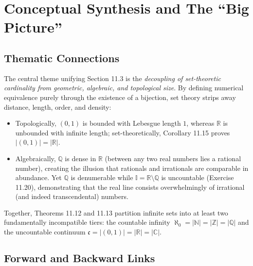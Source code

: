 \documentclass[11pt, letterpaper]{article}
\theoremstyle{definition}
\theoremstyle{remark}
\begin{document}
\section{Conceptual Synthesis and The ``Big Picture''}

\subsection{Thematic Connections}

The central theme unifying Section 11.3 is the \emph{decoupling of set-theoretic cardinality from geometric, algebraic, and topological size}. By defining numerical equivalence purely through the existence of a bijection, set theory strips away distance, length, order, and density:
\begin{itemize}
    \item Topologically, $(0, 1)$ is bounded with Lebesgue length $1$, whereas $\mathbb{R}$ is unbounded with infinite length; set-theoretically, Corollary 11.15 proves $|(0, 1)| = |\mathbb{R}|$.
    \item Algebraically, $\mathbb{Q}$ is dense in $\mathbb{R}$ (between any two real numbers lies a rational number), creating the illusion that rationals and irrationals are comparable in abundance. Yet $\mathbb{Q}$ is denumerable while $\mathbb{I} = \mathbb{R} \setminus \mathbb{Q}$ is uncountable (Exercise 11.20), demonstrating that the real line consists overwhelmingly of irrational (and indeed transcendental) numbers.
\end{itemize}
Together, Theorems 11.12 and 11.13 partition infinite sets into at least two fundamentally incompatible tiers: the countable infinity $\aleph_0 = |\mathbb{N}| = |\mathbb{Z}| = |\mathbb{Q}|$ and the uncountable continuum $\mathfrak{c} = |(0, 1)| = |\mathbb{R}| = |\mathbb{C}|$.

\subsection{Forward and Backward Links}
\end{document}
